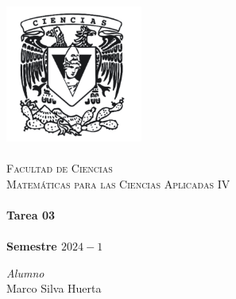 \begin{titlepage}
    \center\newcommand{\HRule}{\rule{\linewidth}{0.5mm}} 
    
    \includegraphics[width=4.5cm]{IMA/Ciencias.png} \\ 
    
    \quad \\[1.5cm]
    \textsc{\Large Facultad de Ciencias}\\[0.5cm] %
    \textsc{\Large Matemáticas para las Ciencias Aplicadas IV}\\[0.5cm] %
    \makeatletter
        \HRule\\ [0.4cm]
            { \huge \bfseries Tarea 03}\\
        \HRule\\ [0.4cm]
    \large\textbf{Semestre $2024-1$}\\
    
    \vspace{20mm}
    \begin{minipage}{0.4\textwidth}
        \begin{flushright} \large
        \centering
            \emph{Alumno} \\ %
            \vspace{3mm}
            Marco Silva Huerta\\                
        \end{flushright}
    \end{minipage}\\[2.2cm]
    


\end{titlepage}
